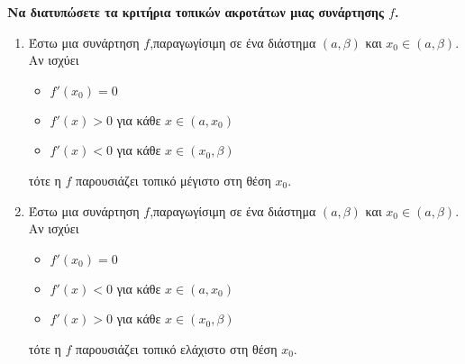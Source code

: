 \documentclass[11pt,a4paper]{article}
\begin{document}
\begin{theory}[resume]
\begin{enumerate}
\end{enumerate}
\item \textbf{Να διατυπώσετε τα κριτήρια τοπικών ακροτάτων μιας συνάρτησης $f$.}
\begin{enumerate}
\item Έστω μια συνάρτηση $f$,παραγωγίσιμη σε ένα διάστημα $(a,\beta)$ και $x_0\in(a,\beta)$. Αν ισχύει
\begin{itemize}
\item $f'(x_0)=0$
\item $f'(x)>0$ για κάθε $x\in(a,x_0)$
\item $f'(x)<0$ για κάθε $x\in(x_0,\beta)$
\end{itemize}
τότε η $f$ παρουσιάζει τοπικό μέγιστο στη θέση $x_0$.
\item Έστω μια συνάρτηση $f$,παραγωγίσιμη σε ένα διάστημα $(a,\beta)$ και $x_0\in(a,\beta)$. Αν ισχύει
\begin{itemize}
\item $f'(x_0)=0$
\item $f'(x)<0$ για κάθε $x\in(a,x_0)$
\item $f'(x)>0$ για κάθε $x\in(x_0,\beta)$
\end{itemize}
τότε η $f$ παρουσιάζει τοπικό ελάχιστο στη θέση $x_0$.
\end{enumerate}
\end{theory}
\end{document}
